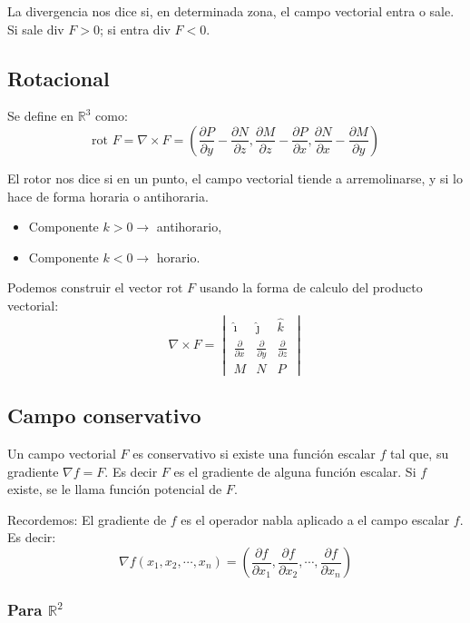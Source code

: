 La divergencia nos dice si, en determinada zona, el campo vectorial entra o sale. Si sale $\text{div }F>0$; si entra $\text{div }F<0$.

\subsection{Rotacional}

Se define en $\mathbb{R}^3$ como:
$$
\text{rot }F = \nabla \times F = \left( \frac{\partial P}{\partial y}-\frac{\partial N}{\partial z}, \frac{\partial M}{\partial z}-\frac{\partial P}{\partial x}, \frac{\partial N}{\partial x}-\frac{\partial M}{\partial y} \right)
$$

El rotor nos dice si en un punto, el campo vectorial tiende a arremolinarse, y si lo hace de forma horaria o antihoraria.
\begin{itemize}
  \item Componente $k>0 \rightarrow$ antihorario,
  \item Componente $k<0\rightarrow$ horario.
\end{itemize}

Podemos construir el vector $\text{rot }F$ usando la forma de calculo del producto vectorial:
$$
\nabla \times F = \begin{vmatrix}
\hat{\imath} & \hat{\jmath} & \hat k \\
\frac{\partial}{\partial x} & \frac{\partial}{\partial y} & \frac{\partial}{\partial z} \\
M & N & P
\end{vmatrix}
$$

\subsection{Campo conservativo}

Un campo vectorial $F$ es conservativo si existe una función escalar $f$ tal que, su gradiente $\nabla f = F$. Es decir $F$ es el gradiente de alguna función escalar. Si $f$ existe, se le llama función potencial de $F$.

Recordemos: El gradiente de $f$ es el operador nabla aplicado a el campo escalar $f$. Es decir:
$$
\nabla f(x_1,x_2,\cdots,x_n) = \left(\frac{\partial f}{\partial x_1},\frac{\partial f}{\partial x_2},\cdots,\frac{\partial f}{\partial x_n}\right)
$$

\subsubsection*{Para $\mathbb{R}^2$}

